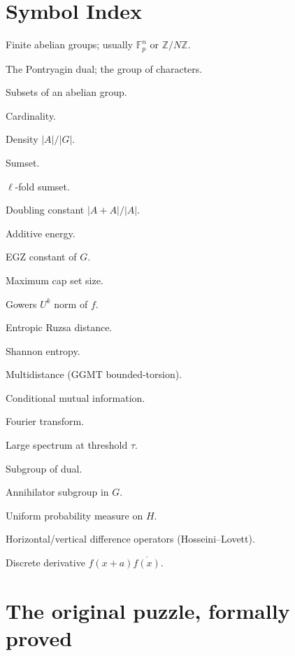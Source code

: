 \documentclass[11pt,a4paper]{article}
\theoremstyle{plain}
\theoremstyle{definition}
\theoremstyle{remark}
\newcommand{\F}{\mathbb{F}}
\newcommand{\Z}{\mathbb{Z}}
\newcommand{\entropy}{\mathbf{H}}
\newcommand{\sUFp}{\mathfrak{s}}
\newcommand{\Spec}{\mathrm{Spec}}
\newcommand{\dist}{d}
\begin{document}
\section{Symbol Index}

\begin{description}[leftmargin=0pt, itemsep=3pt]
\item[$G$, $H$] Finite abelian groups; usually $\F_p^n$ or $\Z/N\Z$.
\item[$\widehat{G}$] The Pontryagin dual; the group of characters.
\item[$A, B$] Subsets of an abelian group.
\item[$|A|$] Cardinality.
\item[$\alpha$] Density $|A|/|G|$.
\item[$A + B$] Sumset.
\item[$\ell A$] $\ell$-fold sumset.
\item[$K$] Doubling constant $|A + A|/|A|$.
\item[$E(A)$] Additive energy.
\item[$\sUFp(G)$] EGZ constant of $G$.
\item[$r(\F_p^n)$] Maximum cap set size.
\item[$\|f\|_{U^k}$] Gowers $U^k$ norm of $f$.
\item[{$\dist[X; Y]$}] Entropic Ruzsa distance.
\item[{$\entropy[X]$}] Shannon entropy.
\item[{$D[X_1, \ldots, X_m]$}] Multidistance (GGMT bounded-torsion).
\item[{$I[X : Y | Z]$}] Conditional mutual information.
\item[$\widehat{f}(\xi)$] Fourier transform.
\item[$\Spec_0(A)$] Large spectrum at threshold $\tau$.
\item[$V \leq \widehat{G}$] Subgroup of dual.
\item[$H = V^\perp$] Annihilator subgroup in $G$.
\item[$\mu_H$] Uniform probability measure on $H$.
\item[$\phi_h$, $\phi_v$] Horizontal/vertical difference operators (Hosseini--Lovett).
\item[$\partial_a f$] Discrete derivative $f(x+a)\overline{f(x)}$.
\end{description}

\section{The original puzzle, formally proved}\label{app:proof-m3}
\end{document}

